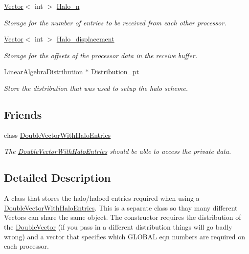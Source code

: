 \begin{DoxyCompactItemize}
\hyperlink{classoomph_1_1Vector}{Vector}$<$ int $>$ \hyperlink{classoomph_1_1DoubleVectorHaloScheme_a47895cdeb23fef294e0facf880847063}{Halo\+\_\+n}
\begin{DoxyCompactList}\small\item\em Storage for the number of entries to be received from each other processor. \end{DoxyCompactList}\item 
\hyperlink{classoomph_1_1Vector}{Vector}$<$ int $>$ \hyperlink{classoomph_1_1DoubleVectorHaloScheme_a4357c43e12dbadede7f9852a96db4391}{Halo\+\_\+displacement}
\begin{DoxyCompactList}\small\item\em Storage for the offsets of the processor data in the receive buffer. \end{DoxyCompactList}\item 
\hyperlink{classoomph_1_1LinearAlgebraDistribution}{Linear\+Algebra\+Distribution} $\ast$ \hyperlink{classoomph_1_1DoubleVectorHaloScheme_a4c3aa7f9d1da907fdbacf79c36355004}{Distribution\+\_\+pt}
\begin{DoxyCompactList}\small\item\em Store the distribution that was used to setup the halo scheme. \end{DoxyCompactList}\end{DoxyCompactItemize}
\subsection*{Friends}
\begin{DoxyCompactItemize}
\item 
class \hyperlink{classoomph_1_1DoubleVectorHaloScheme_acae5914031232d05e22888b081f2598f}{Double\+Vector\+With\+Halo\+Entries}
\begin{DoxyCompactList}\small\item\em The \hyperlink{classoomph_1_1DoubleVectorWithHaloEntries}{Double\+Vector\+With\+Halo\+Entries} should be able to access the private data. \end{DoxyCompactList}\end{DoxyCompactItemize}


\subsection{Detailed Description}
A class that stores the halo/haloed entries required when using a \hyperlink{classoomph_1_1DoubleVectorWithHaloEntries}{Double\+Vector\+With\+Halo\+Entries}. This is a separate class so thay many different Vectors can share the same object. The constructor requires the distribution of the \hyperlink{classoomph_1_1DoubleVector}{Double\+Vector} (if you pass in a different distribution things will go badly wrong) and a vector that specifies which G\+L\+O\+B\+AL eqn numbers are required on each processor. 

